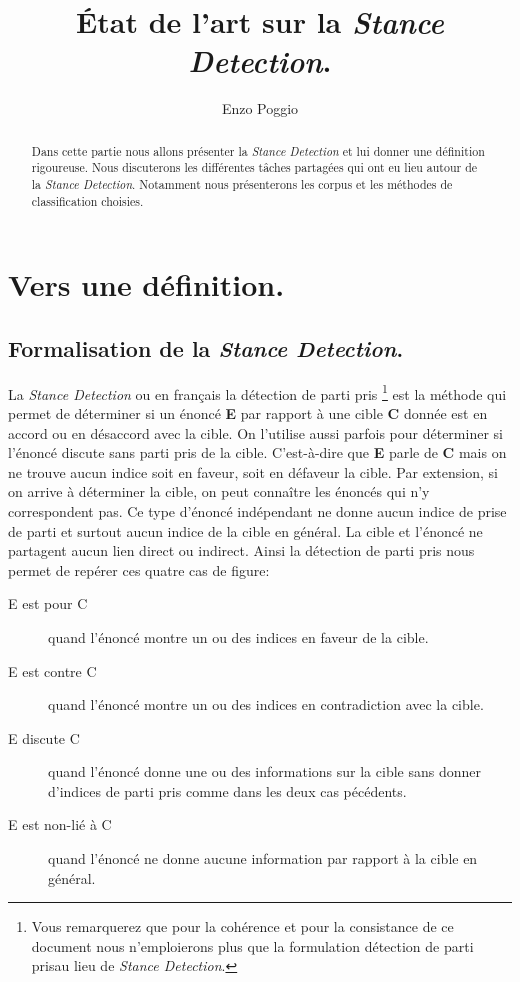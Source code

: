 \documentclass[onecolumn, 12pt]{article}
\title{État de l'art sur la \textit{Stance Detection}.}
\author{Enzo Poggio}
\begin{document}
\maketitle{}
\begin{abstract}
 Dans cette partie nous allons présenter la \textit{Stance Detection} et lui donner une définition rigoureuse.
 Nous discuterons les différentes tâches partagées qui ont eu lieu autour de la \textit{Stance Detection}. Notamment nous présenterons les corpus et les méthodes de classification choisies.
\end{abstract}

\section{Vers une définition.}
\subsection{Formalisation de la \textit{Stance Detection}.}
La \textit{Stance Detection} ou en français la détection de parti pris
\footnote{Vous remarquerez que pour la cohérence et pour la consistance de ce document nous  n'emploierons plus que la formulation \og détection de parti pris\fg au lieu de \og\textit{Stance Detection}\fg.}
est la méthode qui permet de déterminer si un énoncé \textbf{E} par rapport à une cible \textbf{C} donnée est en accord ou en désaccord avec la cible.
On l'utilise aussi parfois pour déterminer si l'énoncé discute sans parti pris de la cible.
C'est-à-dire que \textbf{E} parle de \textbf{C} mais on ne trouve aucun indice soit en faveur, soit en défaveur la cible.
Par extension, si on arrive à déterminer la cible, on peut connaître les énoncés qui n'y correspondent pas.
Ce type d'énoncé indépendant ne donne aucun indice de prise de parti et surtout aucun indice de la cible en général.
La cible et l'énoncé ne partagent aucun lien direct ou indirect.
Ainsi la détection de parti pris nous permet de repérer ces quatre cas de figure:

\begin{description}
 \item [E est pour C] quand l'énoncé montre un ou des indices en faveur de la cible.
 \item [E est contre C] quand l'énoncé montre un ou des indices en contradiction avec la cible.
 \item [E discute C] quand l'énoncé donne une ou des informations sur la cible sans donner d'indices de parti pris comme dans les deux cas pécédents.
 \item [E est non-lié à C] quand l'énoncé ne donne aucune information par rapport à la cible en général.
\end{description}
\end{document}
